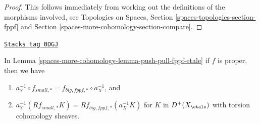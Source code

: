 \begin{proof}
This follows immediately from working out the definitions of the
morphisms involved, see
Topologies on Spaces, Section \ref{spaces-topologies-section-fppf}
and Section \ref{spaces-more-cohomology-section-compare}.
\end{proof}

\begin{lemma}
\label{spaces-more-cohomology-lemma-proper-push-pull-fppf-etale}
\href{https://stacks.math.columbia.edu/tag/0DGJ}{\texttt{Stacks tag 0DGJ}}

In Lemma \ref{spaces-more-cohomology-lemma-push-pull-fppf-etale} if $f$ is proper, then we have
\begin{enumerate}
\item $a_Y^{-1} \circ f_{small, *} = f_{big, fppf, *} \circ a_X^{-1}$, and
\item
$a_Y^{-1}(Rf_{small, *}K) = Rf_{big, fppf, *}(a_X^{-1}K)$
for $K$ in $D^+(X_\etale)$ with torsion cohomology sheaves.
\end{enumerate}
\end{lemma}

